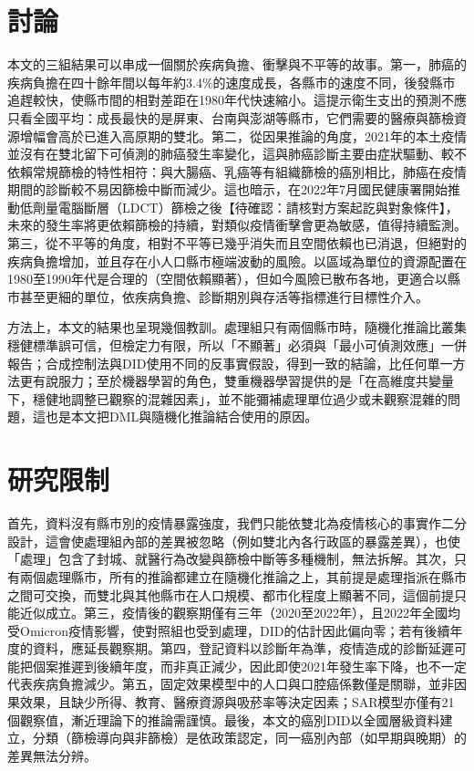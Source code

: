 \documentclass[UTF8,a4paper,11pt]{ctexart}
\newcommand{\note}[1]{\textcolor{red!60!black}{【待確認：#1】}}
\begin{document}
\section{討論}
本文的三組結果可以串成一個關於疾病負擔、衝擊與不平等的故事。第一，肺癌的疾病負擔在四十餘年間以每年約3.4\%的速度成長，各縣市的速度不同，後發縣市追趕較快，使縣市間的相對差距在1980年代快速縮小。這提示衛生支出的預測不應只看全國平均：成長最快的是屏東、台南與澎湖等縣市，它們需要的醫療與篩檢資源增幅會高於已進入高原期的雙北。第二，從因果推論的角度，2021年的本土疫情並沒有在雙北留下可偵測的肺癌發生率變化，這與肺癌診斷主要由症狀驅動、較不依賴常規篩檢的特性相符：與大腸癌、乳癌等有組織篩檢的癌別相比，肺癌在疫情期間的診斷較不易因篩檢中斷而減少。這也暗示，在2022年7月國民健康署開始推動低劑量電腦斷層（LDCT）篩檢之後\note{請核對方案起訖與對象條件}，未來的發生率將更依賴篩檢的持續，對類似疫情衝擊會更為敏感，值得持續監測。第三，從不平等的角度，相對不平等已幾乎消失而且空間依賴也已消退，但絕對的疾病負擔增加，並且存在小人口縣市極端波動的風險。以區域為單位的資源配置在1980至1990年代是合理的（空間依賴顯著），但如今風險已散布各地，更適合以縣市甚至更細的單位，依疾病負擔、診斷期別與存活等指標進行目標性介入。

方法上，本文的結果也呈現幾個教訓。處理組只有兩個縣市時，隨機化推論比叢集穩健標準誤可信，但檢定力有限，所以「不顯著」必須與「最小可偵測效應」一併報告；合成控制法與DID使用不同的反事實假設，得到一致的結論，比任何單一方法更有說服力；至於機器學習的角色，雙重機器學習提供的是「在高維度共變量下，穩健地調整已觀察的混雜因素」，並不能彌補處理單位過少或未觀察混雜的問題，這也是本文把DML與隨機化推論結合使用的原因。

\section{研究限制}
首先，資料沒有縣市別的疫情暴露強度，我們只能依雙北為疫情核心的事實作二分設計，這會使處理組內部的差異被忽略（例如雙北內各行政區的暴露差異），也使「處理」包含了封城、就醫行為改變與篩檢中斷等多種機制，無法拆解。其次，只有兩個處理縣市，所有的推論都建立在隨機化推論之上，其前提是處理指派在縣市之間可交換，而雙北與其他縣市在人口規模、都市化程度上顯著不同，這個前提只能近似成立。第三，疫情後的觀察期僅有三年（2020至2022年），且2022年全國均受Omicron疫情影響，使對照組也受到處理，DID的估計因此偏向零；若有後續年度的資料，應延長觀察期。第四，登記資料以診斷年為準，疫情造成的診斷延遲可能把個案推遲到後續年度，而非真正減少，因此即使2021年發生率下降，也不一定代表疾病負擔減少。第五，固定效果模型中的人口與口腔癌係數僅是關聯，並非因果效果，且缺少所得、教育、醫療資源與吸菸率等決定因素；SAR模型亦僅有21個觀察值，漸近理論下的推論需謹慎。最後，本文的癌別DID以全國層級資料建立，分類（篩檢導向與非篩檢）是依政策認定，同一癌別內部（如早期與晚期）的差異無法分辨。
\end{document}
